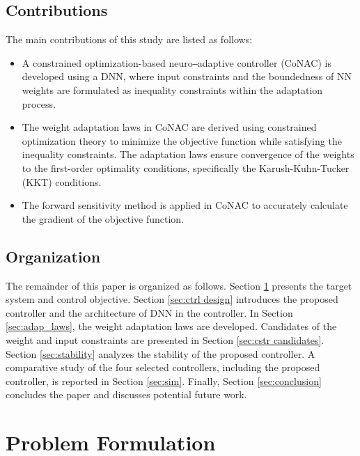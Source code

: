 \documentclass[lettersize,journal]{IEEEtran}
\begin{document}
\subsection{Contributions}

The main contributions of this study are listed as follows:
\begin{itemize}
    \item A constrained optimization-based neuro‒adaptive controller (CoNAC) is developed using a DNN, where input constraints and the boundedness of NN weights are formulated as inequality constraints within the adaptation process.
    \item The weight adaptation laws in CoNAC are derived using constrained optimization theory to minimize the objective function while satisfying the inequality constraints. The adaptation laws ensure convergence of the weights to the first-order optimality conditions, specifically the Karush-Kuhn-Tucker (KKT) conditions.
    \item The forward sensitivity method is applied in CoNAC to accurately calculate the gradient of the objective function.
\end{itemize}

\subsection{Organization}

The remainder of this paper is organized as follows. 
Section \ref{sec: Problem Formulation} presents the target system and control objective.
Section \ref{sec:ctrl design} introduces the proposed controller and the architecture of DNN in the controller. 
In Section \ref{sec:adap_laws}, the weight adaptation laws are developed.
Candidates of the weight and input constraints are presented in Section \ref{sec:cstr candidates}.
Section \ref{sec:stability} analyzes the stability of the proposed controller.
A comparative study of the four selected controllers, including the proposed controller, is reported in Section \ref{sec:sim}.
Finally, Section \ref{sec:conclusion} concludes the paper and discusses potential future work.

\section{Problem Formulation}\label{sec: Problem Formulation}
\end{document}
